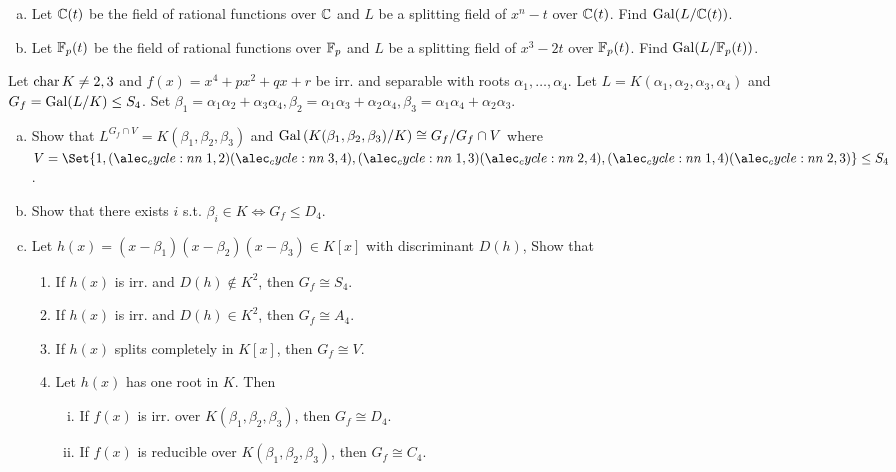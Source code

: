 \begin{exercise} \mbox{}
  \begin{enumerate}[(a)]
    \item Let $\mathbb{C}(t)$ be the field of rational functions over $\mathbb{C}$ and
      $L$ be a splitting field of $x^n - t$ over $\mathbb{C}(t)$.
      Find $\operatorname{Gal}(L / \mathbb{C}(t))$.
    \item Let $\mathbb{F}_p(t)$ be the field of rational functions over $\mathbb{F}_p$ and
      $L$ be a splitting field of $x^3 - 2t$ over $\mathbb{F}_p(t)$.
      Find $\operatorname{Gal}(L / \mathbb{F}_p(t))$.
  \end{enumerate}
\end{exercise}

\begin{exercise}
  Let $\operatorname{char} K \ne 2, 3$ and $f(x) = x^4 + px^2 + qx + r$ be irr. and separable
  with roots $\alpha_1, \dots, \alpha_4$. Let $L = K(\alpha_1, \alpha_2, \alpha_3, \alpha_4)$
  and $G_f = \operatorname{Gal}(L/K) \le S_4$. Set
  $\beta_1 = \alpha_1 \alpha_2 + \alpha_3 \alpha_4,
  \beta_2 = \alpha_1 \alpha_3 + \alpha_2 \alpha_4,
  \beta_3 = \alpha_1 \alpha_4 + \alpha_2 \alpha_3$.
  \begin{enumerate}[(a)]
    \item Show that $L^{G_f \cap V} = K(\beta_1, \beta_2, \beta_3)$ and
      $\operatorname{Gal}\left({K(\beta_1, \beta_2, \beta_3)}/{K}\right) \cong {G_f}/{G_f \cap V}$
      where $V = \Set{1, \cycle{1,2}\cycle{3,4}, \cycle{1,3}\cycle{2,4},
      \cycle{1,4}\cycle{2,3}} \le S_4$.
    \item Show that there exists $i$ s.t. $\beta_i \in K \iff G_f \le D_4$.
    \item Let $h(x) = (x-\beta_1)(x-\beta_2)(x-\beta_3) \in K[x]$ with discriminant
      $D(h)$, Show that
      \begin{enumerate}[(1)]
        \item If $h(x)$ is irr. and $D(h) \not\in K^2$, then $G_f \cong S_4$.
        \item If $h(x)$ is irr. and $D(h) \in K^2$, then $G_f \cong A_4$.
        \item If $h(x)$ splits completely in $K[x]$, then $G_f \cong V$.
        \item Let $h(x)$ has one root in $K$. Then
          \begin{enumerate}[(i)]
            \item If $f(x)$ is irr. over $K(\beta_1, \beta_2, \beta_3)$, then
              $G_f \cong D_4$.
            \item If $f(x)$ is reducible over $K(\beta_1, \beta_2, \beta_3)$, then
              $G_f \cong C_4$.
          \end{enumerate}
      \end{enumerate}
  \end{enumerate}
\end{exercise}
